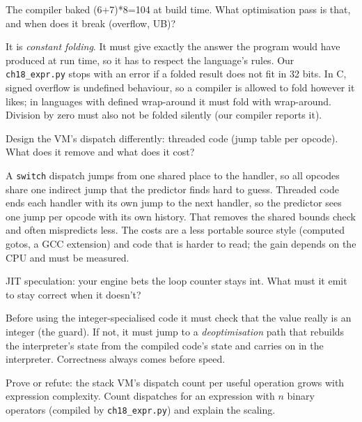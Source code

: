 \begin{exercise}[medium]
The compiler baked (6+7)*8=104 at build time. What optimisation
pass is that, and when does it break (overflow, UB)?
\end{exercise}
\begin{solution}
It is \emph{constant folding}. It must give exactly the answer the program
would have produced at run time, so it has to respect the language's rules.
Our \texttt{ch18\_expr.py} stops with an error if a folded result does not
fit in 32 bits. In C, signed overflow is undefined behaviour, so a compiler is
allowed to fold however it likes; in languages with defined wrap-around it
must fold with wrap-around. Division by zero must also not be folded
silently (our compiler reports it).
\end{solution}
\begin{exercise}[medium]
Design the VM's dispatch differently: threaded code (jump table
per opcode). What does it remove and what does it cost?
\end{exercise}
\begin{solution}
A \texttt{switch} dispatch jumps from one shared place to the handler, so
all opcodes share one indirect jump that the predictor finds hard to guess.
Threaded code ends each handler with its own jump to the next handler, so
the predictor sees one jump per opcode with its own history. That removes
the shared bounds check and often mispredicts less. The costs are a less
portable source style (computed gotos, a GCC extension) and code that is harder
to read; the gain depends on the CPU and must be measured.
\end{solution}
\begin{exercise}[medium]
JIT speculation: your engine bets the loop counter stays int.
What must it emit to stay correct when it doesn't?
\end{exercise}
\begin{solution}
Before using the integer-specialised code it must check that the value
really is an integer (the guard). If not, it must jump to a \emph{deoptimisation}
path that rebuilds the interpreter's state from the compiled code's state
and carries on in the interpreter. Correctness always comes before speed.
\end{solution}
\begin{exercise}[hard]
Prove or refute: the stack VM's dispatch count per useful
operation grows with expression complexity. Count dispatches for an
expression with $n$ binary operators (compiled by \texttt{ch18\_expr.py})
and explain the scaling.
\end{exercise}
